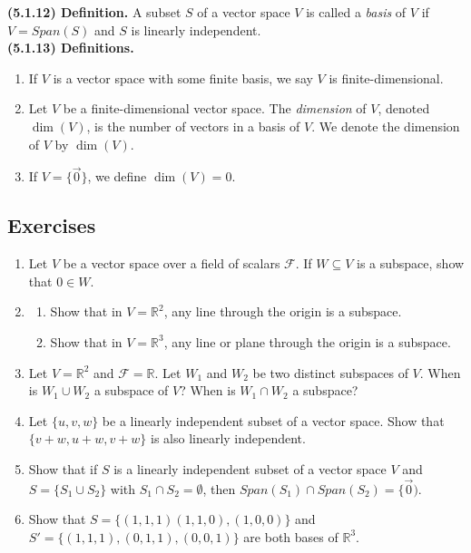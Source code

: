 \documentclass[12pt]{book}
\def\R{{\mathbb{R}}}
\def\cF{{\mathcal{F}}}
\begin{document}

\noindent\textbf{(5.1.12) Definition.} A subset $S$ of a vector space $V$ is called a \textit{basis} of $V$ if $V=Span(S)$ and $S$ is linearly independent.\\

\noindent\textbf{(5.1.13) Definitions.}
\begin{enumerate}[label=(\alph*)]
\item If $V$ is a vector space with some finite basis, we say $V$ is finite-dimensional.
\item Let $V$ be a finite-dimensional vector space. The \textit{dimension} of $V$, denoted $\dim(V)$, is the number of vectors in a basis of $V$. We denote the dimension of $V$ by $\dim(V)$.
\item If $V=\{\vec{0}\}$, we define $\dim(V)=0$.
\end{enumerate}

\subsection*{Exercises}
\begin{enumerate}[itemsep=0.2mm]
\item Let $V$ be a vector space over a field of scalars $\cF$. If $W\subseteq V$ is a subspace, show that $0\in W$.
\item \begin{enumerate}
\item Show that in $V=\R^2$, any line through the origin is a subspace.
\item Show that in $V=\R^3$, any line or plane through the origin is a subspace.
\end{enumerate}
\item Let $V=\R^2$ and $\cF=\R$. Let $W_1$ and $W_2$ be two distinct subspaces of $V$. When is $W_1\cup W_2$ a subspace of $V$? When is $W_1\cap W_2$ a subspace?
\item Let $\{u,v,w\}$ be a linearly independent subset of a vector space. Show that $\{v+w,u+w,v+w\}$ is also linearly independent.
\item Show that if $S$ is a linearly independent subset of a vector space $V$ and $S=\{S_1\cup S_2\}$ with $S_1\cap S_2=\emptyset$, then $Span(S_1)\cap Span(S_2)=\{\vec{0})$.
\item Show that $S=\{(1,1,1)(1,1,0),(1,0,0)\}$ and $S'=\{(1,1,1),(0,1,1),(0,0,1)\}$ are both bases of $\R^3$.
\end{enumerate}
\end{document}
